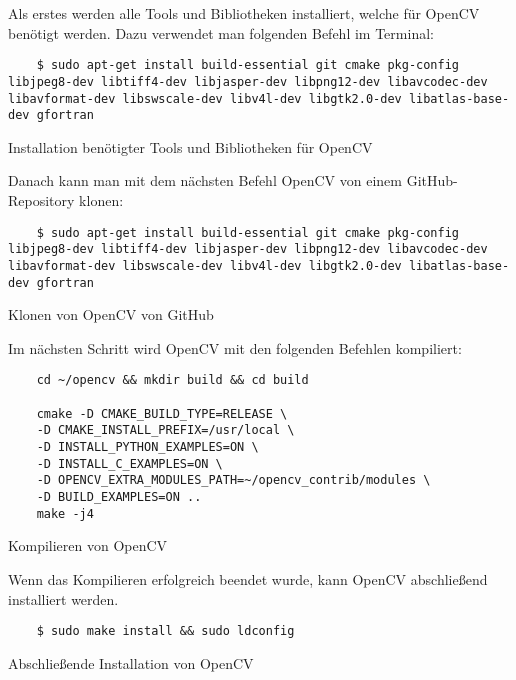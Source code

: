 Als erstes werden alle Tools und Bibliotheken installiert, welche für OpenCV benötigt werden. Dazu verwendet man folgenden Befehl im Terminal:

\begin{listing}[H]
    \begin{verbatim}
    $ sudo apt-get install build-essential git cmake pkg-config libjpeg8-dev libtiff4-dev libjasper-dev libpng12-dev libavcodec-dev libavformat-dev libswscale-dev libv4l-dev libgtk2.0-dev libatlas-base-dev gfortran
    \end{verbatim}
    \caption{Installation benötigter Tools und Bibliotheken für OpenCV}
\end{listing}

Danach kann man mit dem nächsten Befehl OpenCV von einem GitHub-Repository klonen:

\begin{listing}[H]
    \begin{verbatim}
    $ sudo apt-get install build-essential git cmake pkg-config libjpeg8-dev libtiff4-dev libjasper-dev libpng12-dev libavcodec-dev libavformat-dev libswscale-dev libv4l-dev libgtk2.0-dev libatlas-base-dev gfortran
    \end{verbatim}
    \caption{Klonen von OpenCV von GitHub}
\end{listing}

Im nächsten Schritt wird OpenCV mit den folgenden Befehlen kompiliert:

\begin{listing}[H]
    \begin{verbatim}
    cd ~/opencv && mkdir build && cd build

    cmake -D CMAKE_BUILD_TYPE=RELEASE \
    -D CMAKE_INSTALL_PREFIX=/usr/local \
    -D INSTALL_PYTHON_EXAMPLES=ON \
    -D INSTALL_C_EXAMPLES=ON \
    -D OPENCV_EXTRA_MODULES_PATH=~/opencv_contrib/modules \
    -D BUILD_EXAMPLES=ON ..
    make -j4
    \end{verbatim}
    \caption{Kompilieren von OpenCV}
\end{listing}

Wenn das Kompilieren erfolgreich beendet wurde, kann OpenCV abschließend installiert werden.

\begin{listing}[H]
    \begin{verbatim}
    $ sudo make install && sudo ldconfig
    \end{verbatim}
    \caption{Abschließende Installation von OpenCV}
\end{listing}

